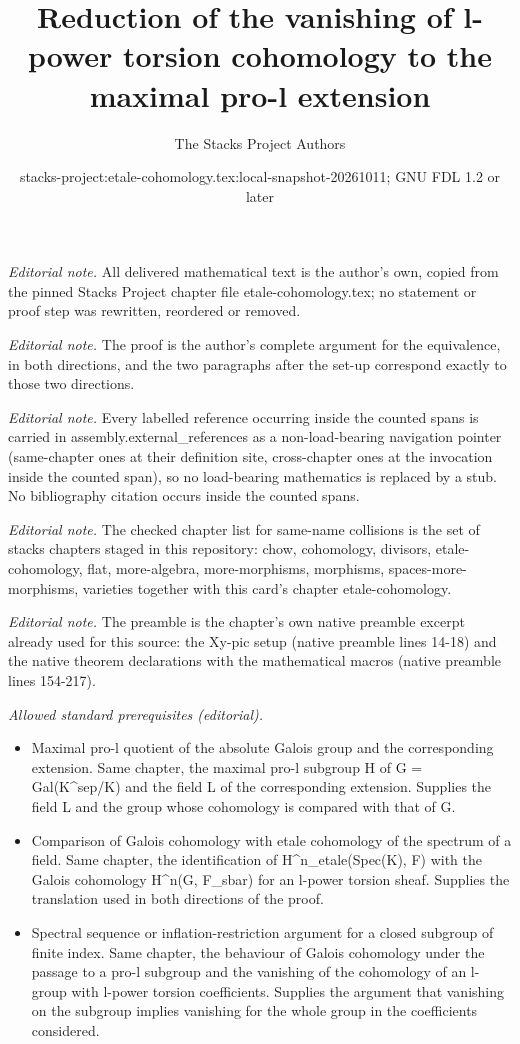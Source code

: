 \documentclass[10pt,a4paper]{amsart}
\title{Reduction of the vanishing of l-power torsion cohomology to the maximal pro-l extension}
\author{The Stacks Project Authors}
\date{stacks-project:etale-cohomology.tex:local-snapshot-20261011; GNU FDL 1.2 or later}
\theoremstyle{plain}
\theoremstyle{definition}
\theoremstyle{remark}
\numberwithin{equation}{subsection}
\begin{document}
\maketitle
\noindent\textit{Editorial note.} All delivered mathematical text is the author's own, copied from the pinned Stacks Project chapter file etale-cohomology.tex; no statement or proof step was rewritten, reordered or removed.\par\medskip
\noindent\textit{Editorial note.} The proof is the author's complete argument for the equivalence, in both directions, and the two paragraphs after the set-up correspond exactly to those two directions.\par\medskip
\noindent\textit{Editorial note.} Every labelled reference occurring inside the counted spans is carried in assembly.external\_references as a non-load-bearing navigation pointer (same-chapter ones at their definition site, cross-chapter ones at the invocation inside the counted span), so no load-bearing mathematics is replaced by a stub. No bibliography citation occurs inside the counted spans.\par\medskip
\noindent\textit{Editorial note.} The checked chapter list for same-name collisions is the set of stacks chapters staged in this repository: chow, cohomology, divisors, etale-cohomology, flat, more-algebra, more-morphisms, morphisms, spaces-more-morphisms, varieties together with this card's chapter etale-cohomology.\par\medskip
\noindent\textit{Editorial note.} The preamble is the chapter's own native preamble excerpt already used for this source: the Xy-pic setup (native preamble lines 14-18) and the native theorem declarations with the mathematical macros (native preamble lines 154-217).\par\medskip
\noindent\textit{Allowed standard prerequisites (editorial).}\begin{itemize}
\item Maximal pro-l quotient of the absolute Galois group and the corresponding extension. Same chapter, the maximal pro-l subgroup H of G = Gal(K\textasciicircum{}sep/K) and the field L of the corresponding extension. Supplies the field L and the group whose cohomology is compared with that of G.
\item Comparison of Galois cohomology with etale cohomology of the spectrum of a field. Same chapter, the identification of H\textasciicircum{}n\_etale(Spec(K), F) with the Galois cohomology H\textasciicircum{}n(G, F\_sbar) for an l-power torsion sheaf. Supplies the translation used in both directions of the proof.
\item Spectral sequence or inflation-restriction argument for a closed subgroup of finite index. Same chapter, the behaviour of Galois cohomology under the passage to a pro-l subgroup and the vanishing of the cohomology of an l-group with l-power torsion coefficients. Supplies the argument that vanishing on the subgroup implies vanishing for the whole group in the coefficients considered.
\end{itemize}\medskip
\end{document}
